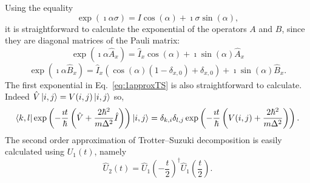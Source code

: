 Using the equality 
\begin{equation}
\exp(\imath \alpha \sigma) = I \cos(\alpha) + \imath \sigma \sin(\alpha),
\end{equation}
it is straightforward to calculate the exponential of the operators $A$ and $B$, since they are diagonal matrices of the Pauli matrix:
\begin{equation} \label{eq:expA}
\exp\left(\imath \alpha \hat{A}_x \right) = \hat{I}_x \cos(\alpha) + \imath \sin(\alpha) \hat{A}_x
\end{equation}
\begin{equation} \label{eq:expB}
\exp\left(\imath \alpha \hat{B}_x \right) = \hat{I}_x (\cos(\alpha)(1-\delta_{x,0}) + \delta_{x,0}) + \imath \sin(\alpha) \hat{B}_x.
\end{equation}
The first exponential in Eq.~\eqref{eq:1approxTS} is also straightforward to calculate. Indeed $\hat{V} \ket{i,j} = V(i,j) \ket{i,j}$ so,
\begin{equation}
\bra{k,l} \exp\left(-\frac{\imath t}{\hbar}\left(\hat{V} + \frac{2 \hbar^2}{m \Delta^2} \hat{I}\right) \right) \ket{i,j} = \delta_{k,i} \delta_{l,j} \exp\left( -\frac{\imath t}{\hbar} \left( V(i,j) + \frac{2 \hbar^2}{m \Delta^2} \right) \right). \nonumber
\end{equation}
The second order approximation of Trotter--Suzuki decomposition is easily calculated using $U_1(t)$, namely
\begin{equation} \label{eq:second-TS-evo-operator}
\hat{U}_2(t) = \hat{U}_1\left( -\frac{t}{2} \right)^\dagger \hat{U}_1\left(\frac{t}{2}\right).
\end{equation}

